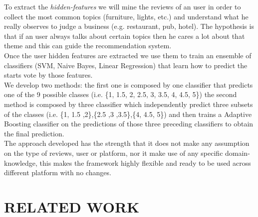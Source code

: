 \documentclass[11pt]{article}
\begin{document}
To extract the \textit{hidden-features} we will mine the reviews of an user in order to collect the most common topics (furniture, lights, etc.) and  understand what he really observes to judge a business (e.g. restaurant, pub, hotel).
The hypothesis is that if an user always talks about certain topics then he cares a lot about that theme and this can guide the recommendation system.\\
Once the user hidden features are extracted we use them to train an ensemble of classifiers (SVM, Naive Bayes, Linear Regression) that learn how to predict the starts vote by those features.\\
We develop two methods: the first one is composed by one classifier that predicts one of the 9 possible classes (i.e. \{1, 1.5, 2, 2.5, 3, 3.5, 4, 4.5, 5\}) the second method is composed by three classifier which independently predict three subsets of the classes (i.e. \{1, 1.5 ,2\},\{2.5 ,3 ,3.5\},\{4, 4.5, 5\}) and then trains a Adaptive Boosting classifier on the predictions of those three preceding classifiers to obtain the final prediction.\\
The approach developed has the strength that it does not make any assumption on the type of reviews, user or platform, nor it make use of any specific domain-knowledge, this makes the framework highly flexible and ready to be used across different platform with no changes.

\section{RELATED WORK}
\end{document}
